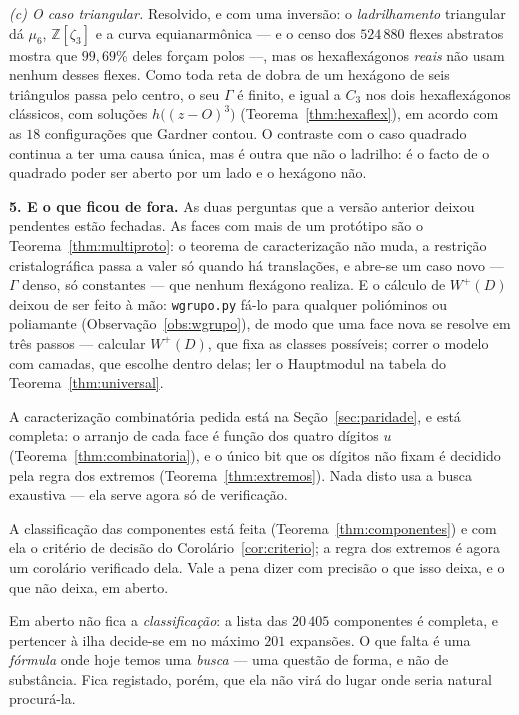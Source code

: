 \documentclass[11pt,a4paper]{article}
\theoremstyle{plain}
\theoremstyle{definition}
\theoremstyle{remark}
\newcommand{\Z}{\mathbb{Z}}
\begin{document}
\smallskip
\emph{(c) O caso triangular.} Resolvido, e com uma inversão: o
\emph{ladrilhamento} triangular dá $\mu_6$, $\Z[\zeta_3]$ e a curva
equianarmônica --- e o censo dos $524\,880$ flexes abstratos mostra que
$99{,}69\%$ deles forçam polos ---, mas os hexaflexágonos \emph{reais} não
usam nenhum desses flexes. Como toda reta de dobra de um hexágono de seis
triângulos passa pelo centro, o seu $\Gamma$ é finito, e igual a $C_3$ nos
dois hexaflexágonos clássicos, com soluções
$h\big((z-O)^3\big)$ (Teorema~\ref{thm:hexaflex}), em acordo com as $18$
configurações que Gardner contou. O contraste com o caso quadrado continua a
ter uma causa única, mas é outra que não o ladrilho: é o facto de o quadrado
poder ser aberto por um lado e o hexágono não.

\smallskip
\textbf{5. E o que ficou de fora.} As duas perguntas que a versão anterior
deixou pendentes estão fechadas. As faces com mais de um protótipo são o
Teorema~\ref{thm:multiproto}: o teorema de caracterização não muda, a
restrição cristalográfica passa a valer só quando há translações, e abre-se um
caso novo --- $\Gamma$ denso, só constantes --- que nenhum flexágono realiza.
E o cálculo de $W^+(D)$ deixou de ser feito à mão: \texttt{wgrupo.py} fá-lo
para qualquer polióminos ou poliamante (Observação~\ref{obs:wgrupo}), de modo
que uma face nova se resolve em três passos --- calcular $W^+(D)$, que fixa as
classes possíveis; correr o modelo com camadas, que escolhe dentro delas; ler
o Hauptmodul na tabela do Teorema~\ref{thm:universal}.

A caracterização combinatória pedida está na Seção~\ref{sec:paridade}, e está
completa: o arranjo de cada face é função dos quatro dígitos $u$
(Teorema~\ref{thm:combinatoria}), e o único bit que os dígitos não fixam é
decidido pela regra dos extremos (Teorema~\ref{thm:extremos}). Nada disto
usa a busca exaustiva --- ela serve agora só de verificação.

A classificação das componentes está feita (Teorema~\ref{thm:componentes}) e
com ela o critério de decisão do Corolário~\ref{cor:criterio}; a regra dos
extremos é agora um corolário verificado dela. Vale a pena dizer com precisão
o que isso deixa, e o que não deixa, em aberto.

Em aberto não fica a \emph{classificação}: a lista das $20\,405$ componentes é
completa, e pertencer à ilha decide-se em no máximo $201$ expansões. O que
falta é uma \emph{fórmula} onde hoje temos uma \emph{busca} --- uma questão de
forma, e não de substância. Fica registado, porém, que ela não virá do lugar
onde seria natural procurá-la.
\end{document}

